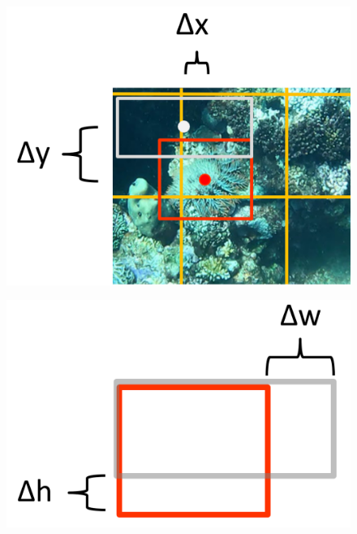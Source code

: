\documentclass[landscape,a2,final,12pt]{issposter}
\begin{document}
\begin{multicols}{3}
\begin{samepage}
\begin{small}
            \begin{figure}
                \centering
                \begin{minipage}[b]{.5\textwidth}
                \centering
                \includegraphics[width=.6\linewidth]{5_loss_center.png}
                \label{fig:test1}
                \end{minipage}%
                \begin{minipage}[b]{.5\textwidth}
                \centering
                \includegraphics[width=.6\linewidth]{5_loss_size.png}
                \label{fig:test2}
                \end{minipage}
            \end{figure}
            

            \end{small}
    \end{samepage}
    \columnbreak
    \begin{samepage}

\end{samepage}
\end{multicols}
\end{document}
